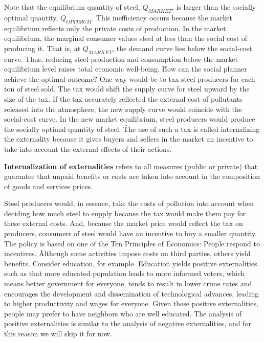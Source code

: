 Note that the equilibrium quantity of steel, $Q_\textit{MARKET}$, is larger than the socially optimal quantity,
$Q_\textit{OPTIMUM}$. This inefficiency occurs because the market equilibrium reflects only the private costs of
production. In the market equilibrium, the marginal consumer values steel at less than the social cost of producing
it. That is, at $Q_\textit{MARKET}$, the demand curve lies below the social-cost curve. Thus, reducing steel
production and consumption below the market equilibrium level raises total economic well-being. \v

How can the social planner achieve the optimal outcome? One way would be to tax steel producers for each ton of steel
sold. The tax would shift the supply curve for steel upward by the size of the tax. If the tax accurately reflected
the external cost of pollutants released into the atmosphere, the new supply curve would coincide with the
social-cost curve. In the new market equilibrium, steel producers would produce the socially optimal quantity of
steel. \v

The use of such a tax is called internalizing the externality because it gives buyers and sellers in the market an
incentive to take into account the external effects of their actions.

\textbf{Internalization of externalities} refers to all measures (public or private) that guarantee that unpaid benefits
or costs are taken into account in the composition of goods and services prices.
\ed

Steel producers would, in essence, take the costs of pollution into account when deciding how much steel to supply
because the tax would make them pay for these external costs. And, because the market price would reflect the tax on
producers, consumers of steel would have an incentive to buy a smaller quantity. The policy is based on one of the
Ten Principles of Economics: People respond to incentives. \v

Although some activities impose costs on third parties, others yield benefits. Consider education, for example.
Education yields positive externalities such as that more educated population leads to more informed voters, which
means better government for everyone, tends to result in lower crime rates and encourages the development and
dissemination of technological advances, leading to higher productivity and wages for everyone. Given these positive
externalities, people may prefer to have neighbors who are well educated. The analysis of positive externalities is
similar to the analysis of negative externalities, and for this reason we will skip it for now.

